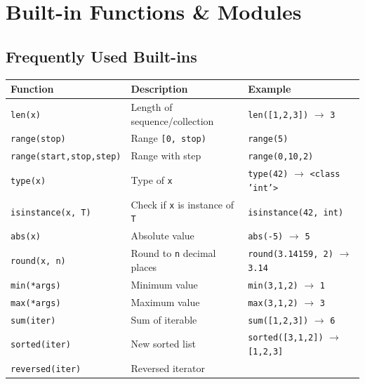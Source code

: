 \documentclass[oneside]{book}
\begin{document}
\section{Built-in Functions \& Modules}

\subsection*{Frequently Used Built-ins}

\begin{center}
\begin{tabularx}{\linewidth}{lXl}
\toprule
\textbf{Function} & \textbf{Description} & \textbf{Example} \\
\midrule
\texttt{len(x)}              & Length of sequence/collection           & \texttt{len([1,2,3])} $\to$ \texttt{3} \\
\texttt{range(stop)}         & Range \texttt{[0, stop)}                & \texttt{range(5)} \\
\texttt{range(start,stop,step)} & Range with step                      & \texttt{range(0,10,2)} \\
\texttt{type(x)}             & Type of \texttt{x}                      & \texttt{type(42)} $\to$ \texttt{<class 'int'>} \\
\texttt{isinstance(x, T)}    & Check if \texttt{x} is instance of \texttt{T} & \texttt{isinstance(42, int)} \\
\texttt{abs(x)}              & Absolute value                          & \texttt{abs(-5)} $\to$ \texttt{5} \\
\texttt{round(x, n)}         & Round to \texttt{n} decimal places      & \texttt{round(3.14159, 2)} $\to$ \texttt{3.14} \\
\texttt{min(*args)}          & Minimum value                           & \texttt{min(3,1,2)} $\to$ \texttt{1} \\
\texttt{max(*args)}          & Maximum value                           & \texttt{max(3,1,2)} $\to$ \texttt{3} \\
\texttt{sum(iter)}           & Sum of iterable                         & \texttt{sum([1,2,3])} $\to$ \texttt{6} \\
\texttt{sorted(iter)}        & New sorted list                         & \texttt{sorted([3,1,2])} $\to$ \texttt{[1,2,3]} \\
\texttt{reversed(iter)}      & Reversed iterator                       & \\

\end{tabularx}
\end{center}
\end{document}
